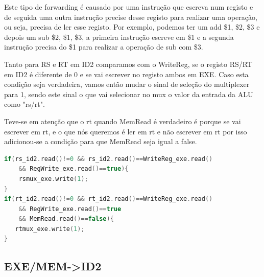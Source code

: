\documentclass[pdftex,12pt,a4paper]{report}
\begin{document}
Este tipo de forwarding é causado por uma instrução que escreva num registo e de seguida uma outra instrução precise desse registo para realizar uma operação, ou seja, precisa de ler esse registo. Por exemplo, podemos ter um add \$1, \$2, \$3 e depois um sub \$2, \$1, \$3, a primeira instrução escreve em \$1 e a segunda instrução precisa do \$1  para realizar a operação de sub com \$3.
\linebreak

Tanto para RS e RT em ID2 comparamos com o WriteReg, se o registo RS/RT em ID2 é diferente de 0 e se vai escrever no registo ambos em EXE. 
Caso esta condição seja verdadeira, vamos então mudar o sinal de seleção do multiplexer para 1, sendo este sinal o que vai selecionar no mux o valor da entrada da ALU como "rs/rt".

Teve-se em atenção que o rt quando MemRead é verdadeiro é porque se vai escrever em rt, e o que nós queremos é ler em rt e não escrever em rt por isso adicionou-se a condição para que MemRead seja igual a false.
\linebreak

\begin{lstlisting}[language=c]
if(rs_id2.read()!=0 && rs_id2.read()==WriteReg_exe.read() 
	&& RegWrite_exe.read()==true){
    rsmux_exe.write(1); 
}
if(rt_id2.read()!=0 && rt_id2.read()==WriteReg_exe.read() 
	&& RegWrite_exe.read()==true 
	&& MemRead.read()==false){
   rtmux_exe.write(1);
}
\end{lstlisting} 

\subsection{EXE/MEM->ID2}

\begin{table}[!htb]
\centering
\label{table_exe_mem_id2}
\end{table}
\end{document}
